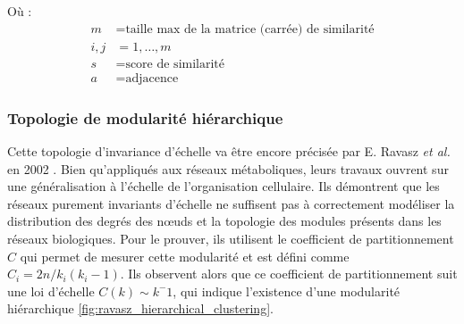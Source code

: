 Où :
\begin{align*}
    m &= \text{taille max de la matrice (carrée) de similarité} \\
    i, j &= 1, \dots, m \\
    s &= \text{score de similarité} \\
    a &= \text{adjacence}
\end{align*}


\subsubsection{Topologie de modularité hiérarchique}

Cette topologie d'invariance d'échelle va être encore précisée par E. Ravasz \textit{et al.} en 2002 \cite{Ravasz2002}. Bien qu'appliqués aux réseaux métaboliques, leurs travaux ouvrent sur une généralisation à l'échelle de l'organisation cellulaire. Ils démontrent que les réseaux purement invariants d'échelle ne suffisent pas à correctement modéliser la distribution des degrés des nœuds et la topologie des modules présents dans les réseaux biologiques. Pour le prouver, ils utilisent le coefficient de partitionnement $C$ qui permet de mesurer cette modularité et est défini comme $C_{i}=2 n / k_{i}\left(k_{i}-1\right)$. Ils observent alors que ce coefficient de partitionnement suit une loi d'échelle $C(k) \sim k^-1$, qui indique l'existence d'une modularité hiérarchique \ref{fig:ravasz_hierarchical_clustering}.

